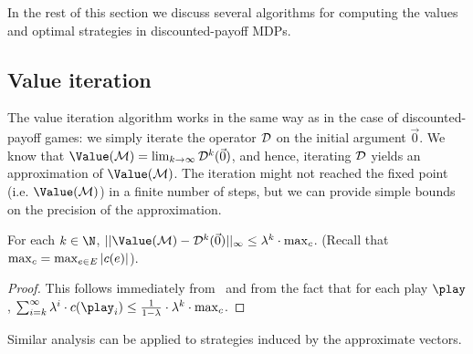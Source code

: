 In the rest of this section we discuss several algorithms for computing the 
values and optimal strategies in discounted-payoff MDPs.

\subsection*{Value iteration}

The value iteration algorithm works in the same way as in the case of 
discounted-payoff games: we simply iterate the operator $\mathcal{D}$ on the 
initial argument $\vec{0}$. We know that $\Value(\mdp)=\lim_{k\rightarrow 
\infty}\discOP^k(\vec{0})$, and hence, iterating $\mathcal{D}$ yields an 
approximation of $\Value(\mdp)$. The iteration might not reached the fixed 
point (i.e. $\Value(\mdp)$) in a finite number of steps, but we can provide 
simple bounds on the precision of the approximation.

\begin{lemma}
\label{5-lem:disc-val-it-convergence}
For each $k\in \N$, $||\Value(\mdp)-\discOP^k(\vec{0}) ||_{\infty} \leq 
\lambda^k \cdot \maxc$. (Recall that $\max_{c}=\max_{e\in 
E}|c(e)|$).	
\end{lemma}
\begin{proof}
This follows immediately from~ and from the fact that 
for each play $\play$, $\sum_{i=k}^{\infty}\lambda^i\cdot 
\colouring(\play_i)\leq \frac{1}{1-\lambda}\cdot\lambda^k \cdot \maxc$.
\end{proof}

Similar analysis can be applied to strategies induced by the approximate 
vectors.

